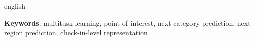 \begin{resumo}[Abstract]
\begin{otherlanguage*}{english}
            \vspace{\onelineskip}
            \noindent
            \begin{minipage}{\linewidth}
                \textbf{Keywords}:
                multitask learning, point of interest, next-category prediction,
                next-region prediction, check-in-level representation
            \end{minipage}
        \end{otherlanguage*}
    \end{resumo}
    \else
    \pagestyle{empty}
    \fi

    \listoffigures*
    \cleardoublepage

    \listoftables*
    \cleardoublepage

